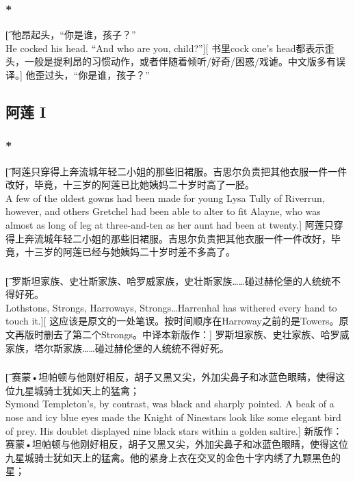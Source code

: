\documentclass[12pt,a4paper]{article}
\begin{document}
\subsubsection{\color{red}*}\t[	
	他昂起头，“你是谁，孩子？”\\
	He cocked his head. “And who are you, child?”][
	书里cock one's head都表示歪头，一般是提利昂的习惯动作，或者伴随着倾听/好奇/困惑/戏谑。中文版多有误译。]
	他歪过头，“你是谁，孩子？”
	
\subsection{阿莲 I}
\subsubsection{\color{red}*}\t[
	 阿莲只穿得上奔流城年轻二小姐的那些旧裙服。吉思尔负责把其他衣服一件一件改好，毕竟，十三岁的阿莲已比她姨妈二十岁时高了一胫。\\
	 A few of the oldest gowns had been made for young Lysa Tully of Riverrun, however, and others Gretchel had been able to alter to fit Alayne, who was almost as long of leg at three-and-ten as her aunt had been at twenty.]
	 阿莲只穿得上奔流城年轻二小姐的那些旧裙服。吉思尔负责把其他衣服一件一件改好，毕竟，十三岁的阿莲已经与她姨妈二十岁时差不多高了。
	 
\subsubsection{}\t[
	罗斯坦家族、史壮斯家族、哈罗威家族，史壮斯家族……碰过赫伦堡的人统统不得好死。\\
	Lothstons, Strongs, Harroways, Strongs\ldots Harrenhal has withered every hand to touch it.][
	这应该是原文的一处笔误。按时间顺序在Harroway之前的是Towers。原文再版时删去了第二个Strongs。中译本新版作：]
	罗斯坦家族、史壮家族、哈罗威家族，塔尔斯家族……碰过赫伦堡的人统统不得好死。
	
\subsubsection{}\t[
	赛蒙•坦帕顿与他刚好相反，胡子又黑又尖，外加尖鼻子和冰蓝色眼睛，使得这位九星城骑士犹如天上的猛禽；\\
	Symond Templeton's, by contrast, was black and sharply pointed. A beak of a nose and icy blue eyes made the Knight of Ninestars look like some elegant bird of prey. His doublet displayed nine black stars within a golden saltire.]
	新版作：赛蒙•坦帕顿与他刚好相反，胡子又黑又尖，外加尖鼻子和冰蓝色眼睛，使得这位九星城骑士犹如天上的猛禽。他的紧身上衣在交叉的金色十字内绣了九颗黑色的星；
	
\end{document}
